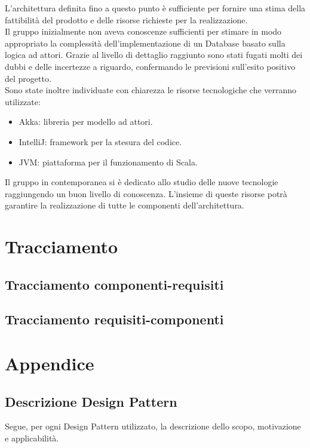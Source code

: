 \documentclass[a4paper]{article}
\begin{document}
		L'architettura definita fino a questo punto è sufficiente per fornire una stima della fattibilità del prodotto e delle risorse richieste per la realizzazione. \\
	Il gruppo inizialmente non aveva conoscenze sufficienti per stimare in modo appropriato la complessità dell'implementazione di un Database basato sulla logica ad attori. Grazie al livello di dettaglio raggiunto sono stati fugati molti dei dubbi e delle incertezze a riguardo, confermando le previsioni sull'esito positivo del progetto. \\
	Sono state inoltre individuate con chiarezza le risorse tecnologiche che verranno utilizzate:
	\begin{itemize}
		\item Akka: libreria per modello ad attori.
		\item IntelliJ: framework per la stesura del codice.
		\item JVM: piattaforma per il funzionamento di Scala.
	\end{itemize}
	Il gruppo in contemporanea si è dedicato allo studio delle nuove tecnologie raggiungendo un buon livello di conoscenza. L'insieme di queste risorse potrà garantire la realizzazione di tutte le componenti dell'architettura.
	
	\newpage 
	\section{Tracciamento}
		\subsection{Tracciamento componenti-requisiti}
		\subsection{Tracciamento requisiti-componenti}
		
	\newpage 
	\section{Appendice}
	\subsection{Descrizione Design Pattern}
	Segue, per ogni Design Pattern utilizzato, la descrizione dello scopo, motivazione e applicabilità.
\end{document}
